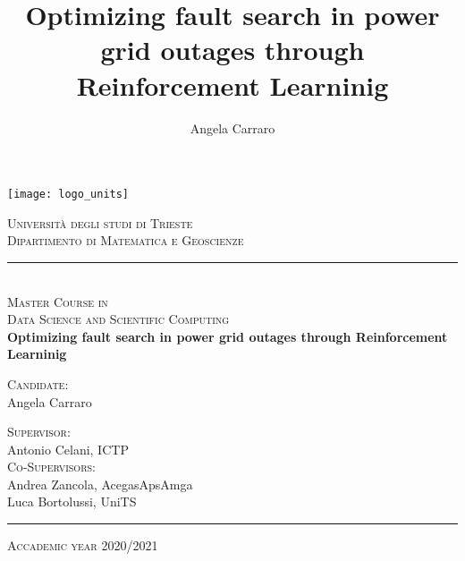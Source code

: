 \def\THauthor{Angela Carraro}
\def\THsupervisor{Antonio Celani, ICTP}%
\def\THcosupervisor{Andrea Zancola, AcegasApsAmga}
\def\THextracosupervisor{Luca Bortolussi, UniTS}
\def\THtitle{Optimizing fault search in power grid outages through Reinforcement Learninig} %
\def\THdate{\monthyear\today}
\def\THplace{Trieste}
\title{\THtitle}
\author{\THauthor}


\graphicspath{{frontmatter/figures/}}
\begin{titlepage}
	
	\begin{center}
	
		\texttt{[image: logo\_units]}\\[0.4cm]
			
		\vspace{0.8cm}
		
		{ \huge \scshape Università degli studi di Trieste }\\[0.25cm]
		{ \Large \scshape Dipartimento di Matematica e Geoscienze }
		\rule{\textwidth}{0.4pt}\\[1cm]

 		{ \Large \scshape Master Course in\\Data Science and Scientific Computing }\\[2cm]
		
		
		{ \huge \bfseries \THtitle }
		
		\vfill
				
		\begin{minipage}[t]{0.45\textwidth}
			\begin{flushleft} %
				{ \large \scshape Candidate: }\\[0.25cm]
				{ \THauthor }
			\end{flushleft}
		\end{minipage}
		\begin{minipage}[t]{0.45\textwidth}
			\begin{flushright} %
				{ \large \scshape Supervisor: } \\[0.25cm]
				{ \THsupervisor } \\[0.30cm]
				{ \large \scshape Co-Supervisors: } \\[0.25cm]
				{ \THcosupervisor }\\[0.10cm]
				{ \THextracosupervisor }
			\end{flushright}
		\end{minipage}
		
		\vspace{2cm}
		
		\rule{\textwidth}{0.4pt}
		{\large \scshape Accademic year 2020/2021 }
		
	\end{center}
	
	\restoregeometry
\end{titlepage}